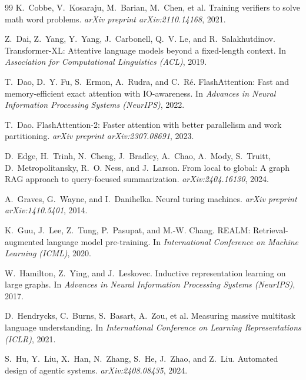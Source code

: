 \documentclass[conference]{IEEEtran}
\begin{document}
\begin{thebibliography}{99}
K.~Cobbe, V.~Kosaraju, M.~Barian, M.~Chen, et al.
\newblock Training verifiers to solve math word problems.
\newblock \emph{arXiv preprint arXiv:2110.14168}, 2021.

Z.~Dai, Z.~Yang, Y.~Yang, J.~Carbonell, Q.~V. Le, and R.~Salakhutdinov.
\newblock Transformer-XL: Attentive language models beyond a fixed-length context.
\newblock In \emph{Association for Computational Linguistics (ACL)}, 2019.

T.~Dao, D.~Y. Fu, S.~Ermon, A.~Rudra, and C.~R{\'e}.
\newblock FlashAttention: Fast and memory-efficient exact attention with IO-awareness.
\newblock In \emph{Advances in Neural Information Processing Systems (NeurIPS)}, 2022.

T.~Dao.
\newblock FlashAttention-2: Faster attention with better parallelism and work partitioning.
\newblock \emph{arXiv preprint arXiv:2307.08691}, 2023.

D.~Edge, H.~Trinh, N.~Cheng, J.~Bradley, A.~Chao, A.~Mody, S.~Truitt, D.~Metropolitansky, R.~O. Ness, and J.~Larson.
\newblock From local to global: A graph {RAG} approach to query-focused summarization.
\newblock \emph{arXiv:2404.16130}, 2024.

A.~Graves, G.~Wayne, and I.~Danihelka.
\newblock Neural turing machines.
\newblock \emph{arXiv preprint arXiv:1410.5401}, 2014.

K.~Guu, J.~Lee, Z.~Tung, P.~Pasupat, and M.-W. Chang.
\newblock REALM: Retrieval-augmented language model pre-training.
\newblock In \emph{International Conference on Machine Learning (ICML)}, 2020.

W.~Hamilton, Z.~Ying, and J.~Leskovec.
\newblock Inductive representation learning on large graphs.
\newblock In \emph{Advances in Neural Information Processing Systems (NeurIPS)}, 2017.

D.~Hendrycks, C.~Burns, S.~Basart, A.~Zou, et al.
\newblock Measuring massive multitask language understanding.
\newblock In \emph{International Conference on Learning Representations (ICLR)}, 2021.

S.~Hu, Y.~Liu, X.~Han, N.~Zhang, S.~He, J.~Zhao, and Z.~Liu.
\newblock Automated design of agentic systems.
\newblock \emph{arXiv:2408.08435}, 2024.


\end{thebibliography}
\end{document}
